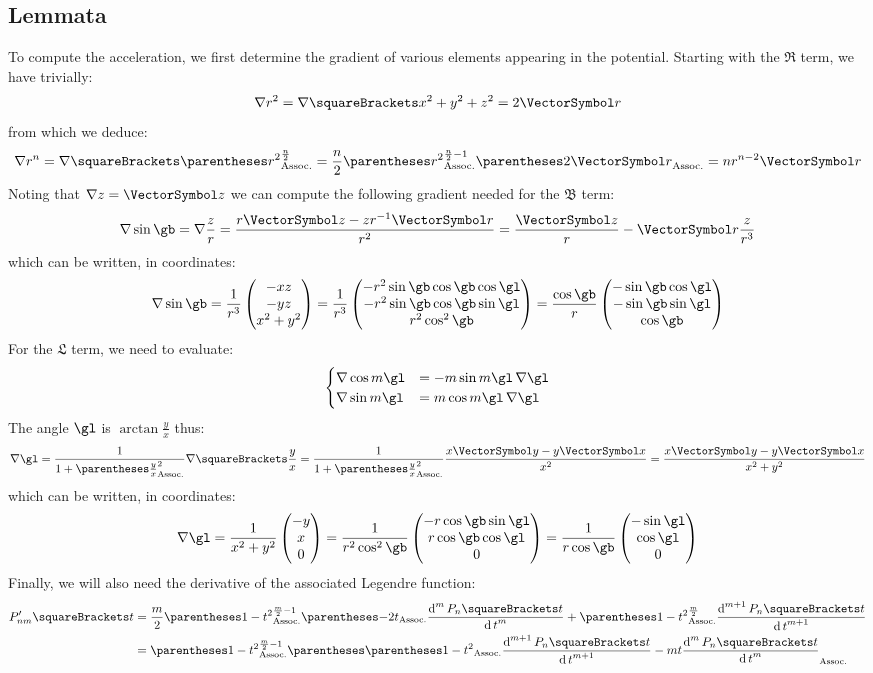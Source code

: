\documentclass[10pt, a4paper, oneside]{basestyle}
\begin{document}
\subsection*{Lemmata}
To compute the acceleration, we first determine the gradient of various elements appearing in the potential.  Starting with the $\mathfrak R$ term, we have trivially:
\[
\grad r^2 = \grad\of{x^2 + y^2 + z^2} = 2 \vr
\]
from which we deduce:
\[
\grad r^n = \grad\of{\pa{r^2}^{\frac{n}{2}}} = \frac{n}{2}\pa{r^2}^{\frac{n}{2} - 1}\pa{2 \vr} = n r^{n - 2} \vr
\]
Noting that $\grad z = \vz$ we can compute the following gradient needed for the $\mathfrak B$ term:
\[
\grad \sin \gb = \grad \frac{z}{r}
= \frac{r \vz - z r^{-1} \vr}{r^2} = \frac{\vz}{r} - \vr \frac{z}{r^3}
\]
which can be written, in coordinates:
\[
\grad \sin \gb =\frac{1}{r^3}\begin{pmatrix}
-x z \\ -y z \\ x^2 + y^2
\end{pmatrix}
=\frac{1}{r^3}\begin{pmatrix}
-r^2 \sin \gb \cos \gb \cos \gl \\
-r^2 \sin \gb \cos \gb \sin \gl \\
r^2 \cos^2 \gb
\end{pmatrix}
=\frac{\cos \gb}{r}\begin{pmatrix}
-\sin \gb \cos \gl \\
-\sin \gb \sin \gl \\
\cos \gb
\end{pmatrix}
\]
For the $\mathfrak L$ term, we need to evaluate:
\[
\begin{cases}
\grad \cos m \gl &= -m \sin m \gl \, \grad \gl \\
\grad \sin m \gl &= m \cos m \gl \, \grad \gl
\end{cases}
\]
The angle $\gl$ is $\arctan\frac{y}{x}$ thus:
\[
\grad \gl = \frac{1}{1 + \pa{\frac{y}{x}}^2} \grad\of{\frac{y}{x}}
= \frac{1}{1 + \pa{\frac{y}{x}}^2}\frac{x \vy - y \vx}{x^2}
= \frac{x \vy - y \vx}{x^2 + y^2}
\]
which can be written, in coordinates:
\[
\grad \gl = \frac{1}{x^2 + y^2}\begin{pmatrix}
-y \\
x \\
0
\end{pmatrix}
= \frac{1}{r^2 \cos^2 \gb}\begin{pmatrix}
-r \cos \gb \sin \gl \\
r \cos \gb \cos \gl \\
0
\end{pmatrix}
= \frac{1}{r \cos \gb}\begin{pmatrix}
-\sin \gl \\
\cos \gl \\
0
\end{pmatrix}
\]
Finally, we will also need the derivative of the associated Legendre function:
\begin{align*}
P_{n m}'\of{t} &= \frac{m}{2} \pa{1 - t^2}^{\frac{m}{2} - 1} \pa{-2 t} \deriv[m]{t}{P_n\of t} +
\pa{1 - t^2}^{\frac{m}{2}} \deriv[m + 1]{t}{P_n\of t}\\
&= \pa{1 - t^2}^{\frac{m}{2} - 1}
\pa{\pa{1 - t^2} \deriv[m + 1]{t}{P_n\of t} - m t \deriv[m]{t}{P_n\of t}}
\end{align*}
\end{document}

